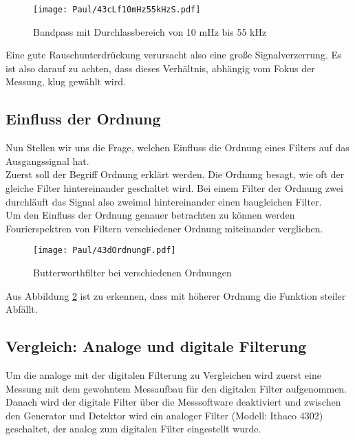 \begin{figure}[h]
    \centering
    \texttt{[image: Paul/43cLf10mHz55kHzS.pdf]}
    \caption{Bandpass mit Durchlassbereich von 10 mHz bis 55 kHz}
    \label{fig:43cBeBa}
\end{figure}

Eine gute Rauschunterdrückung verursacht also eine große Signalverzerrung. Es ist also darauf zu achten, dass dieses Verhältnis, abhängig vom Fokus der Messung, klug gewählt wird.

\newpage
\subsection{Einfluss der Ordnung}
Nun Stellen wir uns die Frage, welchen Einfluss die Ordnung eines Filters auf das Ausgangssignal hat.\\
Zuerst soll der Begriff Ordnung erklärt werden. Die Ordnung besagt, wie oft der gleiche Filter hintereinander geschaltet wird. Bei einem Filter der Ordnung zwei durchläuft das Signal also zweimal hintereinander einen baugleichen Filter.\\

Um den Einfluss der Ordnung genauer betrachten zu können werden Fourierspektren von Filtern verschiedener Ordnung miteinander verglichen.

\begin{figure}[h]
    \centering
    \texttt{[image: Paul/43dOrdnungF.pdf]}
    \caption{Butterworthfilter bei verschiedenen Ordnungen}
    \label{fig:43dOrd}
\end{figure}

Aus Abbildung \ref{fig:43dOrd} ist zu erkennen, dass mit höherer Ordnung die Funktion steiler Abfällt.

\newpage
\subsection{Vergleich: Analoge und digitale Filterung}
Um die analoge mit der digitalen Filterung zu Vergleichen wird zuerst eine Messung mit dem gewohntem Messaufbau für den digitalen Filter aufgenommen. Danach wird der digitale Filter über die Messsoftware deaktiviert und zwischen den Generator und Detektor wird ein analoger Filter (Modell: Ithaco 4302) geschaltet, der analog zum digitalen Filter eingestellt wurde.

